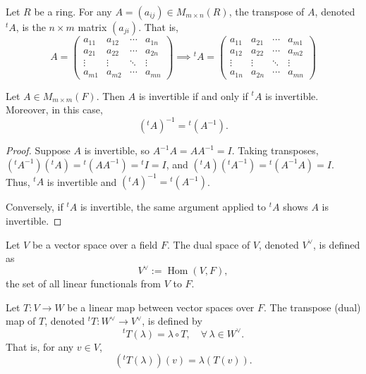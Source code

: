 \begin{definition}
  Let $R$ be a ring. For any $A = (a_{ij}) \in M_{m \times n}(R)$, the transpose of $A$, denoted ${}^t\!A$, is the $n \times m$ matrix $(a_{ji})$. That is,
  \[
    A =
    \begin{pmatrix}
      a_{11} & a_{12} & \cdots & a_{1n} \\
      a_{21} & a_{22} & \cdots & a_{2n} \\
      \vdots & \vdots & \ddots & \vdots \\
      a_{m1} & a_{m2} & \cdots & a_{mn}
    \end{pmatrix}
    \implies
    {}^t\!A =
    \begin{pmatrix}
      a_{11} & a_{21} & \cdots & a_{m1} \\
      a_{12} & a_{22} & \cdots & a_{m2} \\
      \vdots & \vdots & \ddots & \vdots \\
      a_{1n} & a_{2n} & \cdots & a_{mn}
    \end{pmatrix}
  \]
\end{definition}

\begin{proposition}
  Let $A \in M_{m \times m}(F)$. Then $A$ is invertible if and only if ${}^t\!A$ is invertible. Moreover, in this case,
  \[
    ({}^t\!A)^{-1} = {}^t\!(A^{-1}).
  \]
\end{proposition}

\begin{proof}
  Suppose $A$ is invertible, so $A^{-1}A = AA^{-1} = I$. Taking transposes, $({}^t\!A^{-1})({}^t\!A) = {}^t\!(A A^{-1}) = {}^t\!I = I$, and $({}^t\!A)({}^t\!A^{-1}) = {}^t\!(A^{-1}A) = I$. Thus, ${}^t\!A$ is invertible and $({}^t\!A)^{-1} = {}^t\!(A^{-1})$.

  Conversely, if ${}^t\!A$ is invertible, the same argument applied to ${}^t\!A$ shows $A$ is invertible.
\end{proof}

\begin{definition}
  Let $V$ be a vector space over a field $F$. The dual space of $V$, denoted $V^\vee$, is defined as
  \[
    V^\vee := \operatorname{Hom}(V, F),
  \]
  the set of all linear functionals from $V$ to $F$.
\end{definition}

\begin{definition}
  Let $T: V \to W$ be a linear map between vector spaces over $F$. The transpose (dual) map of $T$, denoted ${}^t\!T : W^\vee \to V^\vee$, is defined by
  \[
    {}^t\!T(\lambda) = \lambda \circ T, \quad \forall\, \lambda \in W^\vee.
  \]
  That is, for any $v \in V$,
  \[
    ({}^t\!T(\lambda))(v) = \lambda(T(v)).
  \]
\end{definition}

